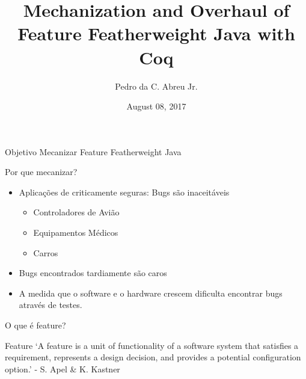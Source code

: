 \documentclass{beamer}
\title[Mechanization and Overhaul of FFJ]{Mechanization and Overhaul of Feature Featherweight Java with Coq}
\author{Pedro da C. Abreu Jr.}
\institute[UnB]
{
	Universidade de Brasilia 
}
\date{August 08, 2017}
\begin{document}
	
	\begin{frame}
		\titlepage
	\end{frame}
	

    \begin{frame}{Objetivo}
        \centering
        {\only<2->{\color{red}}Mecanizar} {Feature} Featherweight Java 
        \\
    \end{frame}
    
    \begin{frame}{Por que mecanizar?}
        \begin{itemize}
            \item Aplicações de criticamente seguras: Bugs são inaceitáveis
            \begin{itemize}
                \item Controladores de Avião
                \item Equipamentos Médicos
                \item Carros
            \end{itemize}
        \item Bugs encontrados tardiamente são caros
        \item A medida que o software e o hardware crescem dificulta encontrar
            bugs através de testes.
        \end{itemize}
    \end{frame}

    \begin{frame}{O que é feature?}
        \centering
        \begin{block}{Feature}
            `A feature is a unit of functionality of a software system
            that satisfies a requirement, represents a design decision, and provides a potential
            configuration option.' - S. Apel \& K. Kastner
        \end{block}
    \end{frame}
\end{document}
